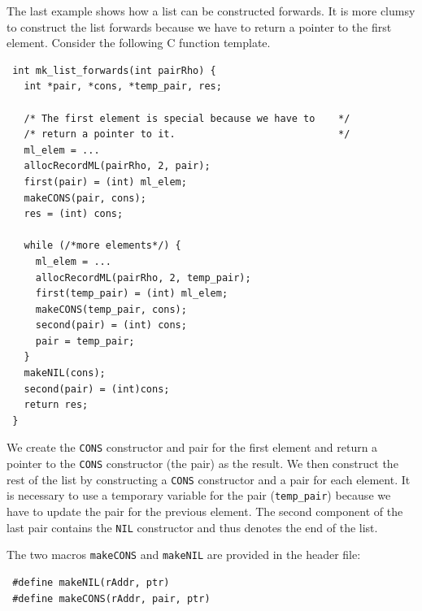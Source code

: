 \documentclass[12pt]{book}
\begin{document}
The last example shows how a list can be constructed forwards. It is more
clumsy to construct the list forwards because we have to return a pointer
to the first element. Consider the following C function template.
%
\begin{verbatim}
 int mk_list_forwards(int pairRho) {
   int *pair, *cons, *temp_pair, res;

   /* The first element is special because we have to    */
   /* return a pointer to it.                            */
   ml_elem = ...
   allocRecordML(pairRho, 2, pair);
   first(pair) = (int) ml_elem;
   makeCONS(pair, cons);
   res = (int) cons;

   while (/*more elements*/) {
     ml_elem = ...
     allocRecordML(pairRho, 2, temp_pair);
     first(temp_pair) = (int) ml_elem;
     makeCONS(temp_pair, cons);
     second(pair) = (int) cons;
     pair = temp_pair;
   }
   makeNIL(cons);
   second(pair) = (int)cons;
   return res;
 }
\end{verbatim}

We create the \texttt{CONS} constructor and pair for the first element
and return a pointer to the \texttt{CONS} constructor (the pair) as
the result. We then construct the rest of the list by constructing a
\texttt{CONS} constructor and a pair for each element. It is necessary
to use a temporary variable for the pair (\verb|temp_pair|) because we
have to update the pair for the previous element. The second component
of the last pair contains the \texttt{NIL} constructor and thus
denotes the end of the list.

The two macros \texttt{makeCONS} and \texttt{makeNIL} are provided in
the  header file:
%
%
\begin{verbatim}
 #define makeNIL(rAddr, ptr)
 #define makeCONS(rAddr, pair, ptr)
\end{verbatim}

\end{document}
